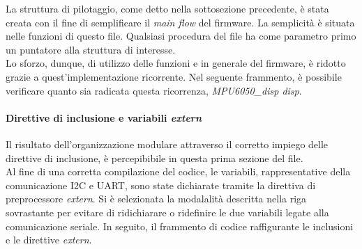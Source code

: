 \documentclass[11pt]{report}
\begin{document}
La struttura di pilotaggio, come detto nella sottosezione precedente, è stata creata con il fine di semplificare il \textit{main flow} del firmware. La semplicità è situata nelle funzioni di questo file. Qualsiasi procedura del file ha come parametro primo un puntatore alla struttura di interesse.\\
Lo sforzo, dunque, di utilizzo delle funzioni e in generale del firmware, è ridotto grazie a quest'implementazione ricorrente.
Nel seguente frammento, è possibile verificare quanto sia radicata questa ricorrenza, \textit{MPU6050\_disp disp}.


\paragraph{Direttive di inclusione e variabili \textit{extern}}
Il risultato dell'organizzazione modulare attraverso il corretto impiego delle direttive di inclusione, è percepibibile in questa prima sezione del file.\\
Al fine di una corretta compilazione del codice, le variabili, rappresentative della comunicazione I2C e UART, sono state dichiarate tramite la direttiva di preprocessore \textit{extern}.
Si è selezionata la modalalità descritta nella riga sovrastante per evitare di ridichiarare o ridefinire le due variabili legate alla comunicazione seriale.
In seguito, il frammento di codice raffigurante le inclusioni e le direttive \textit{extern}.

\end{document}
